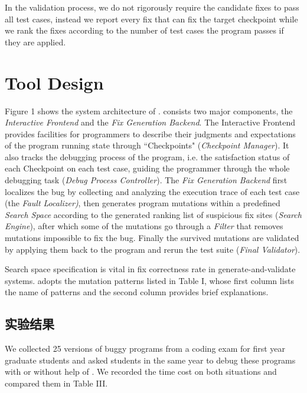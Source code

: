 In the validation process, we do not rigorously require the candidate fixes to pass all test cases, instead we report every fix that can fix the target checkpoint while we rank the fixes according to the number of test cases the program passes if they are applied.
\section{Tool Design}

Figure 1 shows the system architecture of \SmartDebug. \SmartDebug consists two major components, the \textit{Interactive Frontend} and the \textit{Fix Generation Backend}. The Interactive Frontend provides facilities for programmers to describe their judgments and expectations of the program running state through ``Checkpoints" (\textit{Checkpoint Manager}). It also tracks the debugging process of the program, i.e. the satisfaction status of each Checkpoint on each test case, guiding the programmer through the whole debugging task (\textit{Debug Process Controller}). The \textit{Fix Generation Backend} first localizes the bug by collecting and analyzing the execution trace of each test case (the \textit{Fault Localizer)}, then generates program mutations within a predefined \textit{Search Space} according to the generated ranking list of suspicious fix sites (\textit{Search Engine}), after which some of the mutations go through a \textit{Filter} that removes mutations impossible to fix the bug. Finally the survived mutations are validated by applying them back to the program and rerun the test suite (\textit{Final Validator}).

Search space specification is vital in fix correctness rate in generate-and-validate systems. \SmartDebug adopts the mutation patterns listed in Table I, whose first column lists the name of patterns and the second column provides brief explanations.

\subsection{实验结果}
We collected 25 versions of buggy programs from a coding exam for first year graduate students and asked students in the same year to debug these programs with or without help of \SmartDebug. We recorded the time cost on both situations and compared them in Table III.


